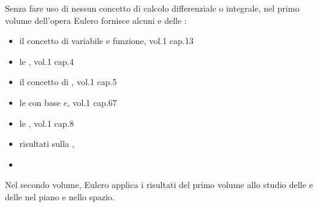 \documentclass[letterpaper,10pt,english]{jupyterBook}
\begin{document}
\sphinxAtStartPar
Senza fare uso di nessun concetto di calcolo differenziale o integrale, nel primo volume dell’opera Eulero fornisce alcuni  e delle :
\begin{itemize}
\item {} 
\sphinxAtStartPar
il concetto di variabile e funzione, vol.1 cap.1\sphinxhyphen{}3

\item {} 
\sphinxAtStartPar
le {\hyperref[\detokenize{ch/series:math-hs-series}]{}}, vol.1 cap.4

\item {} 
\sphinxAtStartPar
il concetto di {\hyperref[\detokenize{ch/precalculus/multivariable-real-fun:math-hs-precalculus-multivariable-real-fun}]{}}, vol.1 cap.5

\item {} 
\sphinxAtStartPar
le {\hyperref[\detokenize{ch/exponential_logarithm:math-hs-exp-log}]{}} con base \(e\), vol.1 cap.6\sphinxhyphen{}7

\item {} 
\sphinxAtStartPar
le {\hyperref[\detokenize{ch/trigonometry:math-hs-trigonometry}]{}}, vol.1 cap.8

\item {} 
\sphinxAtStartPar
risultati sulla {\hyperref[\detokenize{ch/precalculus/polynomials:math-hs-precalculus-polynomials}]{}}, 

\item {} 
\sphinxAtStartPar
{}  

\end{itemize}

\sphinxAtStartPar
Nel secondo volume, Eulero applica i risultati del primo volume allo studio delle  e delle  nel piano e nello spazio.

\sphinxstepscope
\end{document}
